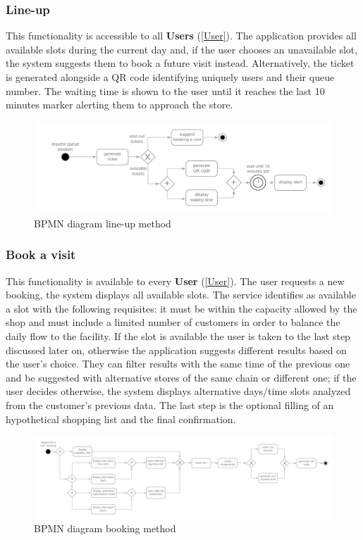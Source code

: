 \documentclass[table, 12pt]{article}
\begin{document}
\subsubsection{Line-up}
\label{line_up}
This functionality is accessible to all \textbf{Users} (\ref{User}). The application provides all available slots during the current day and, if the user chooses an unavailable slot, the system suggests them to book a future visit instead.
Alternatively, the ticket is generated alongside a QR code identifying uniquely users and their queue number. The waiting time is shown to the user until it reaches the last 10 minutes marker alerting them to approach the store.
\begin{figure}[!htb]
    \begin{center}
        \includegraphics[scale=0.29]{assets/function-line-up.png}
        \caption{BPMN diagram line-up method}
    \end{center}
\end{figure}

\subsubsection{Book a visit}
\label{book_a_visit}
This functionality is available to every \textbf{User} (\ref{User}). The user requests a new booking, the system displays all available slots. The service identifies as available a slot with the following requisites: it must be within the capacity allowed by the shop and must include a limited number of customers in order to balance the daily flow to the facility. If the slot is available the user is taken to the last step discussed later on, otherwise the application suggests different results based on the user's choice. They can filter results with the same time of the previous one and be suggested with alternative stores of the same chain or different one; if the user decides otherwise, the system displays alternative days/time slots analyzed from the customer's previous data.
The last step is the optional filling of an hypothetical shopping list and the final confirmation.
\begin{figure}[!htb]
    \begin{center}
        \includegraphics[scale=0.2]{assets/function-book-a-visit.png}
        \caption{BPMN diagram booking method}
    \end{center}
\end{figure}
\end{document}
